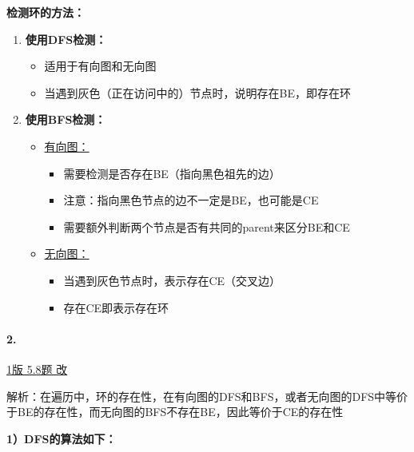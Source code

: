 \documentclass{article}
\begin{document}
\noindent\textbf{检测环的方法：}

\begin{enumerate}
    \item \textbf{使用DFS检测：}
    \begin{itemize}
        \item 适用于有向图和无向图
        \item 当遇到灰色（正在访问中的）节点时，说明存在BE，即存在环
    \end{itemize}

    \item \textbf{使用BFS检测：}
    \begin{itemize}
        \item \underline{有向图：}
        \begin{itemize}
            \item 需要检测是否存在BE（指向黑色祖先的边）
            \item 注意：指向黑色节点的边不一定是BE，也可能是CE
            \item 需要额外判断两个节点是否有共同的parent来区分BE和CE
        \end{itemize}
        \item \underline{无向图：}
        \begin{itemize}
            \item 当遇到灰色节点时，表示存在CE（交叉边）
            \item 存在CE即表示存在环
        \end{itemize}
    \end{itemize}
\end{enumerate}

\pagebreak

\paragraph{2.}

\href{https://github.com/Shannju/njucser_helphelp/blob/main/Algorithm%E7%AE%97%E6%B3%95/%E7%AD%94%E6%A1%88/%E7%AE%97%E6%B3%95%E7%AD%94%E6%A1%88csdn%EF%BC%88%E5%8A%A9%E6%95%99%E5%B7%B2%E5%88%A0%E9%99%A4.pdf}{1版 5.8题 改}

\noindent 解析：在遍历中，环的存在性，在有向图的DFS和BFS，或者无向图的DFS中等价于BE的存在性，而无向图的BFS不存在BE，因此等价于CE的存在性

\noindent\textbf{1）DFS的算法如下：}
\end{document}
